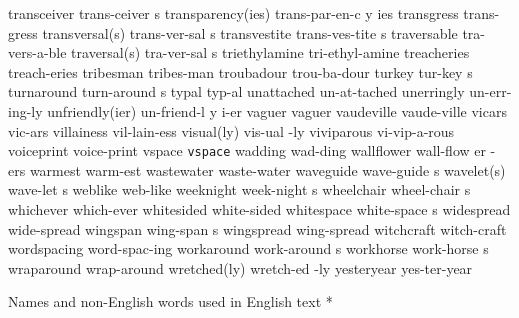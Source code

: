 \5 transceiver		trans-ceiver s
\NewWordtrue
\3 transparency(ies)	trans-par-en-c y ies	%
\1 transgress		trans-gress
\2 transversal(s)	trans-ver-sal s
\5 transvestite		trans-ves-tite s
\1 traversable		tra-vers-a-ble
\2 traversal(s)		tra-ver-sal s
\1 triethylamine	tri-ethyl-amine		%
\1 treacheries		treach-eries
\1 tribesman		tribes-man		%
\1 troubadour		trou-ba-dour
\5 turkey		tur-key s
\5 turnaround		turn-around s
\1 typal		typ-al
\1 unattached		un-at-tached
\1 unerringly		un-err-ing-ly
\3 unfriendly(ier)	un-friend-l y i-er
\1 vaguer		vaguer
\1 vaudeville		vaude-ville
\1 vicars		vic-ars
\1 villainess		vil-lain-ess
\2 visual(ly)		vis-ual -ly		%
\1 viviparous		vi-vip-a-rous
\1 voiceprint		voice-print
\1 vspace 		{\tt\bs vspace}
\1 wadding		wad-ding
\6 wallflower		wall-flow er -ers
\1 warmest		warm-est	%
\1 wastewater		waste-water
\5 waveguide		wave-guide s
\2 wavelet(s)		wave-let s
\1 weblike		web-like
\5 weeknight		week-night s
\5 wheelchair		wheel-chair s
\1 whichever		which-ever
\1 whitesided		white-sided
\5 whitespace		white-space s
\1 widespread		wide-spread
\5 wingspan		wing-span s	%
\1 wingspread		wing-spread
\1 witchcraft		witch-craft
\1 wordspacing		word-spac-ing
\5 workaround		work-around s		%
\5 workhorse		work-horse s
\1 wraparound		wrap-around
\2 wretched(ly)		wretch-ed -ly
\1 yesteryear		yes-ter-year
\endgraf
\endgroup

\head * Names and non-English words \break used in English text *


